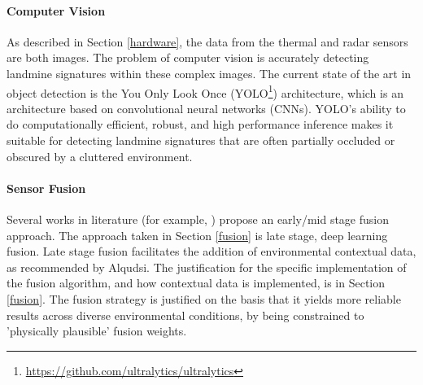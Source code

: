     \paragraph{Computer Vision} 

        \noindent As described in Section \ref{hardware}, the data from the thermal and radar sensors are both images. The problem of computer vision is accurately detecting landmine signatures within these complex images. The current state of the art in object detection is the You Only Look Once (YOLO\footnote{\url{https://github.com/ultralytics/ultralytics}}) architecture, which is an architecture based on convolutional neural networks (CNNs). YOLO's ability to do computationally efficient, robust, and high performance inference makes it suitable for detecting landmine signatures that are often partially occluded or obscured by a cluttered environment.
    
    \paragraph{Sensor Fusion} 
    
        \noindent Several works in literature (for example, \cite{qui2023fusion}) propose an early/mid stage fusion approach. The approach taken in Section \ref{fusion} is late stage, deep learning fusion. Late stage fusion facilitates the addition of environmental contextual data, as recommended by Alqudsi. The justification for the specific implementation of the fusion algorithm, and how contextual data is implemented, is in Section \ref{fusion}. The fusion strategy is justified on the basis that it yields more reliable results across diverse environmental conditions, by being constrained to 'physically plausible' fusion weights.
    


